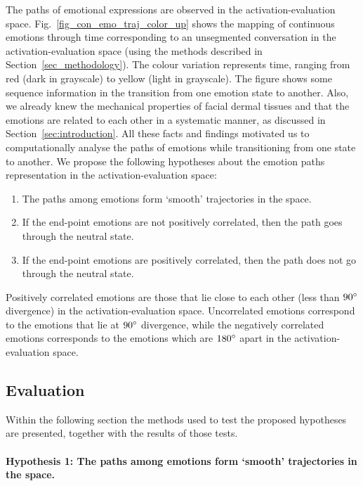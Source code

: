\documentclass[10pt,journal,cspaper,compsoc]{IEEEtran}
\begin{document}

The paths of emotional expressions are observed in the activation-evaluation space. Fig.~\ref{fig_con_emo_traj_color_up} shows the mapping of continuous emotions through time corresponding to an unsegmented conversation in the activation-evaluation space (using the methods described in Section~\ref{sec_methodology}). The colour variation represents time, ranging from red (dark in grayscale) to yellow (light in grayscale). The figure shows some sequence information in the transition from one emotion state to another. Also, we already knew the mechanical properties of facial dermal tissues and that the emotions are related to each other in a systematic manner, as discussed in Section~\ref{sec:introduction}. All these facts and findings motivated us to computationally analyse the paths of emotions while transitioning from one state to another. We propose the following hypotheses about the emotion paths representation in the activation-evaluation space:

\begin{enumerate}
\item The paths among emotions form `smooth' trajectories in the space.
\item If the end-point emotions are not positively correlated, then the path goes through the neutral state.
\item If the end-point emotions are positively correlated, then the path does not go through the neutral state.
\end{enumerate}

Positively correlated emotions are those that lie close to each other (less than $90\degree$ divergence) in the activation-evaluation space. Uncorrelated emotions correspond to the emotions that lie at $90\degree$ divergence, while the negatively correlated emotions corresponds to the emotions which are $180\degree$ apart in the activation-evaluation space. 

\subsection{Evaluation}
\label{sec_evaluation}

Within the following section the methods used to test the proposed hypotheses are presented, together with the results of those tests.

\paragraph*{Hypothesis 1: The paths among emotions form `smooth' trajectories in the space.}
\label{para_hypothesis_1}
\end{document}

